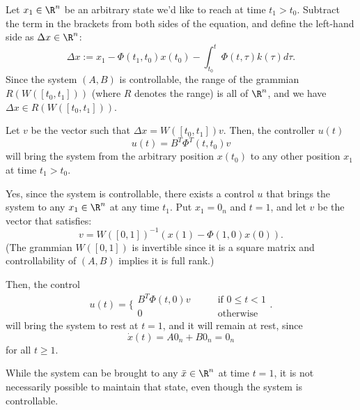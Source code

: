 \documentclass{homework}
\begin{document}
\begin{letterenum}
    Let $x_1 \in \R^n$ be an arbitrary state we'd like to reach at time $t_1 > t_0$.
    Subtract the term in the brackets from both sides of the equation, and 
    define the left-hand side as $\Delta x \in \R^n$:
    \begin{equation*}
        \Delta x := x_1 - \Phi(t_1, t_0) x(t_0) -
            \int_{t_0}^{t} \Phi(t, \tau) k(\tau) d\tau.
    \end{equation*}
    Since the system $(A, B)$ is controllable, the range of the grammian
    $R(W([t_0, t_1]))$ (where $R$ denotes the range) is all of $\R^n$, and we have
    $\Delta x \in R(W([t_0, t_1]))$.

    Let $v$ be the vector such that $\Delta x = W([t_0, t_1]) v$.
    Then, the controller $u(t)$
    \begin{equation*}
        u(t) = B^T \Phi^T(t, t_0) v
    \end{equation*}
    will bring the system from the arbitrary position $x(t_0)$ to any
    other position $x_1$ at time $t_1 > t_0$.

\item Yes, since the system is controllable, there exists a control $u$
    that brings the system to any $x_1 \in \R^n$ at any time $t_1$. Put
    $x_1 = 0_n$ and $t = 1$, and let $v$ be the vector that satisfies:
    \begin{equation*}
        v = W([0, 1])^{-1} (x(1) - \Phi(1, 0) x(0)).
    \end{equation*}
    (The grammian $W([0, 1])$ is invertible since it is a square matrix and
    controllability of $(A, B)$ implies it is full rank.)

    Then, the control
    \begin{equation*}
        u(t) = \biggl\{
            \begin{array}{ll}
                B^T \Phi(t, 0) v &\qquad \text{if } 0 \leq t < 1 \\
                0   &\qquad \text{otherwise}
            \end{array}
        \biggr.
    \end{equation*}
    will bring the system to rest at $t=1$, and it will remain at rest,
    since
    \begin{equation*}
        \dot x(t) = A 0_n + B 0_n = 0_n
    \end{equation*}
    for all $t \geq 1$.

\item While the system can be brought to any $\bar{x} \in \R^n$ at time $t=1$,
    it is not necessarily possible to maintain that state, even though the 
    system is controllable.


\end{letterenum}
\end{document}
